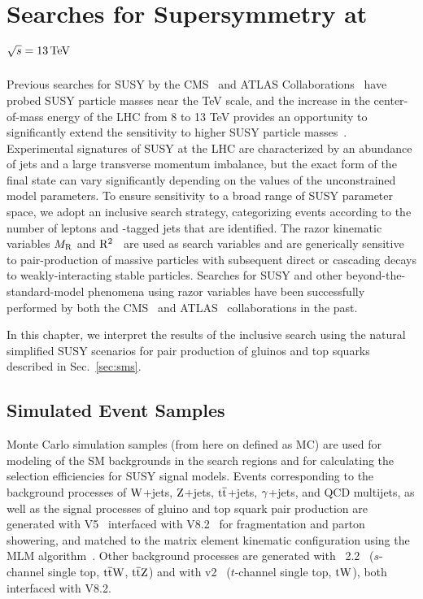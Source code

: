 \chapter{Searches for Supersymmetry at $\sqrt{s}=13\,\text{Te\hspace{-.08em}V}$}
\label{sec:analysis13TeV}
Previous searches for SUSY by the
CMS~\cite{1LepMVA,SUS12024,Chatrchyan:2014lfa,Chatrchyan:2013iqa,Chatrchyan:2013fea,Chatrchyan:2013lya,MT2at8TeV}
and ATLAS Collaborations~\cite{Aad:2013wta,Aad:2014lra,Aad:2014pda,Aad:2014bva,Aad:2014qaa,Atlas3rdGen,Atlas8tevSummary}
have probed SUSY particle masses near the TeV scale, and the increase in the center-of-mass
energy of the LHC from 8 to 13 TeV provides an opportunity to
significantly extend the sensitivity to higher SUSY particle masses~\cite{atlasFullHad13TeV,RA2b13TeV,MT213TeV}.
Experimental signatures of SUSY at the LHC are characterized by an abundance of jets
and a large transverse momentum imbalance, but the exact form of the final state can vary significantly
depending on the values of the unconstrained model parameters. To ensure sensitivity 
to a broad range of SUSY parameter space, we adopt an inclusive search 
strategy, categorizing events according to the number of leptons and \cPqb-tagged jets that are 
identified. The razor kinematic variables $M_\mathrm{R}$ and $\mathrm{R}^2$~\cite{rogan,razorPRL,razorPRD} 
are used as search variables and are generically sensitive to
pair-production of massive particles with subsequent direct or cascading
decays to weakly-interacting stable particles. Searches for SUSY and
other beyond-the-standard-model phenomena using razor variables have been successfully performed by both the 
CMS~\cite{razorPRL,razorPRD,razor8TeV,Khachatryan:2016zcu,Khachatryan:2016reg} and 
ATLAS~\cite{Aad:2012naa,ATLAS-dilepton} 
collaborations in the past.

In this chapter, we interpret the results of the inclusive search using 
the natural simplified SUSY scenarios for pair production of gluinos and top
squarks described in Sec.~\ref{sec:sms}.


\section{Simulated Event Samples}
Monte Carlo simulation samples (from here on defined as MC) are used for modeling of the SM backgrounds
in the search regions and for calculating the selection efficiencies for SUSY signal models.
Events corresponding to the background processes of $\mathrm{W}$+jets, $\mathrm{Z}$+jets, $\mathrm{t}\overline{\mathrm{t}}$+jets, $\gamma$+jets,
and QCD multijets, as well as the signal processes of gluino and top squark
pair production are generated with \MADGRAPH V5~\cite{Alwall:2011uj} interfaced with \PYTHIA
V8.2~\cite{Sjostrand2008852} for fragmentation and parton
showering, and matched to the matrix element kinematic configuration using the MLM
algorithm~\cite{Hoche:2006ph}. Other background processes are generated with
\MATNLO~2.2~\cite{Alwall:2014hca} ($s$-channel single top, $\mathrm{t}\overline{\mathrm{t}}\mathrm{W}$, $\mathrm{t}\overline{\mathrm{t}}\mathrm{Z}$) and 
with \POWHEG v2~\cite{Alioli:2009je, Re:2010bp} ($t$-channel
single top, $\mathrm{t}\mathrm{W}$), both interfaced with \PYTHIA V8.2. 

